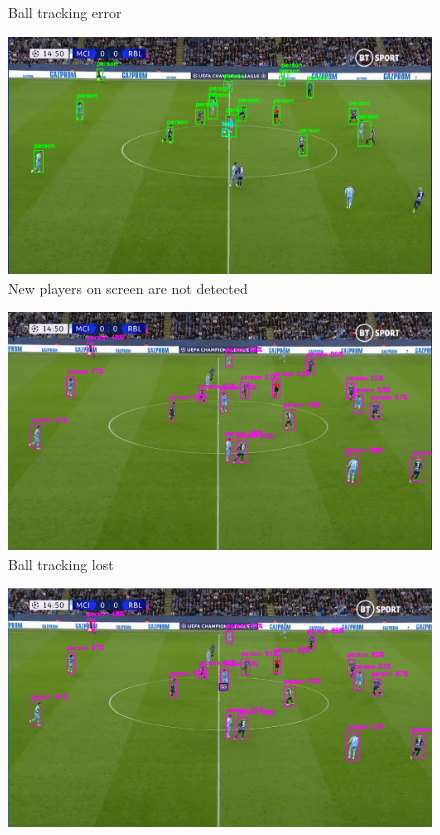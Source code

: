\documentclass[
    11pt,
    oneside
]{report}
\begin{document}
\begin{appendices}
\begin{figure}[H]
    \caption{Ball tracking error}
    \label{img:3}
\end{figure}
\begin{figure}[H]
    \includegraphics[keepaspectratio, width=\columnwidth]{Screenshot_2022-03-03_21-36-05.png}
    \caption{New players on screen are not detected}
    \label{img:4}
\end{figure}
\begin{figure}[H]
    \includegraphics[keepaspectratio, width=\columnwidth]{Screenshot_2022-03-03_21-38-04.png}
    \caption{Ball tracking lost}
    \label{img:5}
\end{figure}
\begin{figure}[H]
    \includegraphics[keepaspectratio, width=\columnwidth]{Screenshot_2022-03-03_21-36-47.png}

\end{figure}
\end{appendices}
\end{document}
